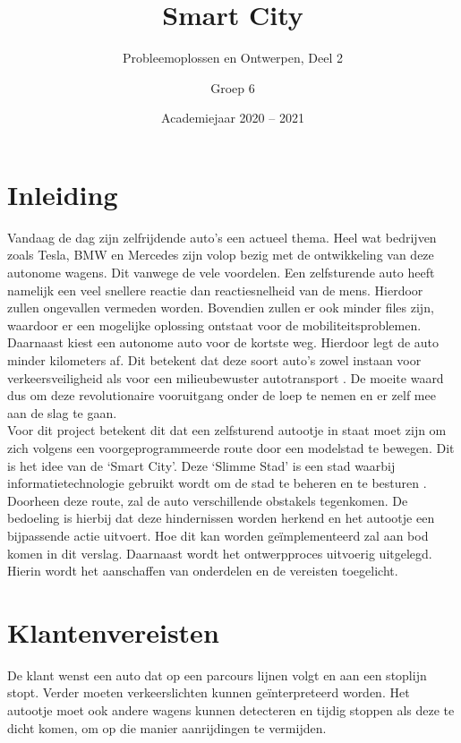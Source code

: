\documentclass[a4paper,twoside,kulak]{kulakreport} %
\title{Smart City}
\subtitle{Probleemoplossen en Ontwerpen, Deel 2}
\author{Groep 6}
\institute {Aaron Vandenberghe, Dieter Demuynck, Jolien Barbier\\  
	Mathis Bossuyt, Rani Jans en Sarah De Meester \\~\\ 
	o.l.v. Benjamin Maveau Kevin Truyaert en Martijn Boussé}
\date{Academiejaar 2020 -- 2021}
\begin{document}

\titlepage 
\tableofcontents
\renewcommand\thesection{\arabic{section}}
\renewcommand\thesubsection{\thesection.\arabic{subsection}}
\newpage
\section*{Inleiding}\label{Inleiding}
Vandaag de dag zijn zelfrijdende auto's een actueel thema. Heel wat bedrijven zoals Tesla, BMW en Mercedes zijn volop bezig met de ontwikkeling van deze autonome wagens. Dit vanwege de vele voordelen. Een zelfsturende auto heeft namelijk een veel snellere reactie dan reactiesnelheid van de mens. Hierdoor zullen ongevallen vermeden worden. Bovendien zullen er ook minder files zijn, waardoor er een mogelijke oplossing ontstaat voor de mobiliteitsproblemen. Daarnaast kiest een autonome auto voor de kortste weg. Hierdoor legt de auto minder kilometers af. Dit betekent dat deze soort auto's zowel instaan voor verkeersveiligheid als voor een milieubewuster autotransport \cite{AutonomeAutos1, AutonomeAutos2}. De moeite waard dus om deze revolutionaire vooruitgang onder de loep te nemen en er zelf mee aan de slag te gaan.\\
Voor dit project betekent dit dat een zelfsturend autootje in staat moet zijn om zich volgens een voorgeprogrammeerde route door een modelstad te bewegen. Dit is het idee van de `Smart City'. Deze `Slimme Stad' is een stad waarbij informatietechnologie gebruikt wordt om de stad te beheren en te besturen \cite{SmartCity}. Doorheen deze route, zal de auto verschillende obstakels tegenkomen. De bedoeling is hierbij dat deze hindernissen worden herkend en het autootje een bijpassende actie uitvoert. Hoe dit kan worden geïmplementeerd zal aan bod komen in dit verslag. Daarnaast wordt het ontwerpproces uitvoerig uitgelegd. Hierin wordt het aanschaffen van onderdelen en de vereisten toegelicht.


\section{Klantenvereisten} \label{Klantenvereisten}
De klant wenst een auto dat op een parcours lijnen volgt en aan een stoplijn stopt. Verder moeten verkeerslichten kunnen geïnterpreteerd worden. Het autootje moet ook andere wagens kunnen detecteren en tijdig stoppen als deze te dicht komen, om op die manier aanrijdingen te vermijden.
\end{document}
